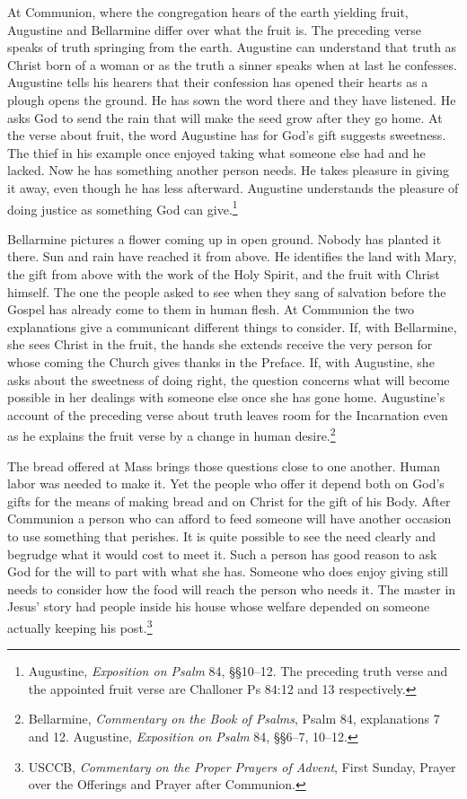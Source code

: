 At Communion, where the congregation hears of the earth yielding fruit, Augustine and Bellarmine differ over what the fruit is. The preceding verse speaks of truth springing from the earth. Augustine can understand that truth as Christ born of a woman or as the truth a sinner speaks when at last he confesses. Augustine tells his hearers that their confession has opened their hearts as a plough opens the ground. He has sown the word there and they have listened. He asks God to send the rain that will make the seed grow after they go home. At the verse about fruit, the word Augustine has for God's gift suggests sweetness. The thief in his example once enjoyed taking what someone else had and he lacked. Now he has something another person needs. He takes pleasure in giving it away, even though he has less afterward. Augustine understands the pleasure of doing justice as something God can give.\footnote{Augustine, \textit{Exposition on Psalm} 84, §§10--12. The preceding truth verse and the appointed fruit verse are Challoner Ps 84:12 and 13 respectively.}

Bellarmine pictures a flower coming up in open ground. Nobody has planted it there. Sun and rain have reached it from above. He identifies the land with Mary, the gift from above with the work of the Holy Spirit, and the fruit with Christ himself. The one the people asked to see when they sang of salvation before the Gospel has already come to them in human flesh. At Communion the two explanations give a communicant different things to consider. If, with Bellarmine, she sees Christ in the fruit, the hands she extends receive the very person for whose coming the Church gives thanks in the Preface. If, with Augustine, she asks about the sweetness of doing right, the question concerns what will become possible in her dealings with someone else once she has gone home. Augustine's account of the preceding verse about truth leaves room for the Incarnation even as he explains the fruit verse by a change in human desire.\footnote{Bellarmine, \textit{Commentary on the Book of Psalms}, Psalm 84, explanations 7 and 12. Augustine, \textit{Exposition on Psalm} 84, §§6--7, 10--12.}

The bread offered at Mass brings those questions close to one another. Human labor was needed to make it. Yet the people who offer it depend both on God's gifts for the means of making bread and on Christ for the gift of his Body. After Communion a person who can afford to feed someone will have another occasion to use something that perishes. It is quite possible to see the need clearly and begrudge what it would cost to meet it. Such a person has good reason to ask God for the will to part with what she has. Someone who does enjoy giving still needs to consider how the food will reach the person who needs it. The master in Jesus' story had people inside his house whose welfare depended on someone actually keeping his post.\footnote{USCCB, \textit{Commentary on the Proper Prayers of Advent}, First Sunday, Prayer over the Offerings and Prayer after Communion.}
